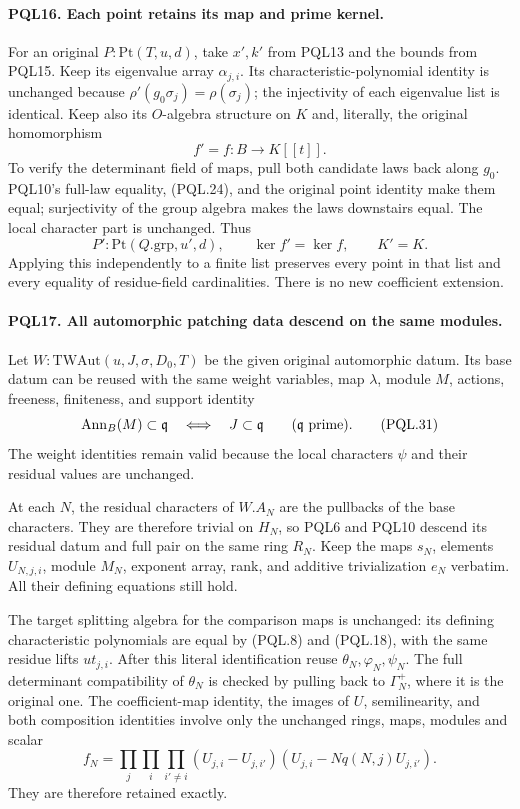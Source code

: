 \paragraph{PQL16. Each point retains its map and prime kernel.}
\label{claim:PQL16}
For an original \(P:\mathrm{Pt}(T,u,d)\), take
\(x',k'\) from PQL13 and the bounds from PQL15.
Keep its eigenvalue array \(\alpha_{j,i}\).
Its characteristic-polynomial identity is unchanged
because \(\rho'(g_0\sigma_j)=\rho(\sigma_j)\);
the injectivity of each eigenvalue list is identical.
Keep also its \(O\)-algebra structure on \(K\) and,
literally, the original homomorphism
\[
 f'=f:B\longrightarrow K[[t]].                     \tag{PQL.29}
\]
To verify the determinant field of \(\mathrm{maps}\),
pull both candidate laws back along \(g_0\).
PQL10's full-law equality, (PQL.24), and the original
point identity make them equal; surjectivity of the
group algebra makes the laws downstairs equal.
The local character part is unchanged.
Thus
\[
 P':\mathrm{Pt}(Q.\mathrm{grp},u',d),\qquad
 \ker f'=\ker f,\qquad K'=K.                        \tag{PQL.30}
\]
Applying this independently to a finite list preserves
every point in that list and every equality of residue-field
cardinalities. There is no new coefficient extension.

\paragraph{PQL17. All automorphic patching data descend on the same modules.}
\label{claim:PQL17}
Let \(W:\mathrm{TWAut}(u,J,\sigma,D_0,T)\) be the
given original automorphic datum. Its base datum can
be reused with the same weight variables, map
\(\lambda\), module \(M\), actions, freeness, finiteness,
and support identity
\[
 \operatorname{Ann}_B(M)\subset\mathfrak q
              \quad\Longleftrightarrow\quad J\subset\mathfrak q
       \qquad(\mathfrak q\ {\rm prime}).             \tag{PQL.31}
\]
The weight identities remain valid because the local
characters \(\psi\) and their residual values are unchanged.

At each \(N\), the residual characters of \(W.A_N\)
are the pullbacks of the base characters. They are
therefore trivial on \(H_N\), so PQL6 and PQL10
descend its residual datum and full pair on the
same ring \(R_N\). Keep the maps \(s_N\), elements
\(U_{N,j,i}\), module \(M_N\), exponent array, rank,
and additive trivialization \(e_N\) verbatim.
All their defining equations still hold.

The target splitting algebra for the comparison maps
is unchanged: its defining characteristic polynomials
are equal by (PQL.8) and (PQL.18), with the same
residue lifts \(ut_{j,i}\).
After this literal identification reuse
\(\theta_N,\varphi_N,\psi_N\). The full determinant
compatibility of \(\theta_N\) is checked by pulling
back to \(\Gamma_N^+\), where it is the original one.
The coefficient-map identity, the images of \(U\),
semilinearity, and both composition identities involve
only the unchanged rings, maps, modules and scalar
\[
 f_N=\prod_j\prod_i\prod_{i'\ne i}
 (U_{j,i}-U_{j,i'})(U_{j,i}-Nq(N,j)U_{j,i'}).
                                                            \tag{PQL.32}
\]
They are therefore retained exactly.

